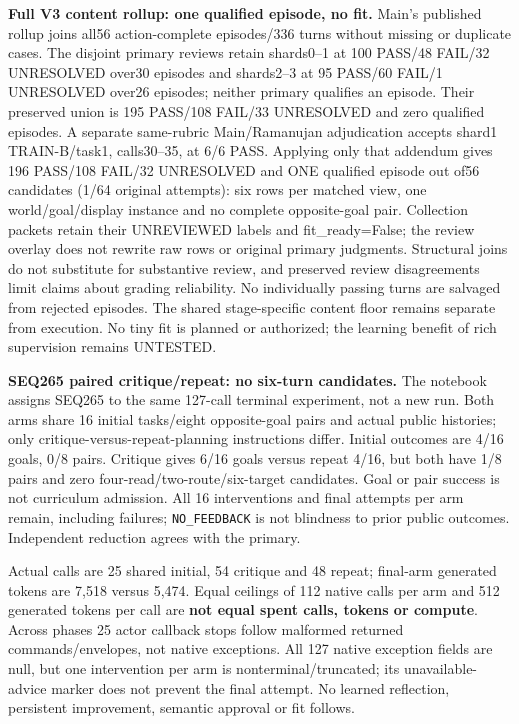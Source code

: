 \documentclass[11pt]{article}
\begin{document}
\textbf{Full V3 content rollup: one qualified episode, no fit.}
Main's published rollup joins all56 action-complete episodes/336 turns without
missing or duplicate cases. The disjoint primary reviews retain shards0--1 at
100 PASS/48 FAIL/32 UNRESOLVED over30 episodes and shards2--3 at
95 PASS/60 FAIL/1 UNRESOLVED over26 episodes; neither primary qualifies an
episode. Their preserved union is 195 PASS/108 FAIL/33 UNRESOLVED and
zero qualified episodes. A separate same-rubric Main/Ramanujan adjudication
accepts shard1 TRAIN-B/task1, calls30--35, at 6/6 PASS. Applying only that
addendum gives 196 PASS/108 FAIL/32 UNRESOLVED and ONE qualified episode
out of56 candidates (1/64 original attempts): six rows per matched view,
one world/goal/display instance and no complete opposite-goal pair.
Collection packets retain their UNREVIEWED labels and fit\_ready=False;
the review overlay does not rewrite raw rows or original primary judgments.
Structural joins do not substitute for substantive review, and preserved
review disagreements limit claims about grading reliability. No individually
passing turns are salvaged from rejected episodes. The shared stage-specific
content floor remains separate from execution. No tiny fit is planned or
authorized; the learning benefit of rich supervision remains UNTESTED.

\textbf{SEQ265 paired critique/repeat: no six-turn candidates.} The notebook assigns
SEQ265 to the same 127-call terminal experiment, not a new run.
Both arms share 16 initial tasks/eight opposite-goal pairs and actual public
histories; only critique-versus-repeat-planning instructions differ. Initial
outcomes are 4/16 goals, 0/8 pairs. Critique gives 6/16 goals versus repeat 4/16,
but both have 1/8 pairs and zero four-read/two-route/six-target candidates.
Goal or pair success is not curriculum admission. All 16 interventions and
final attempts per arm remain, including failures; \texttt{NO\_FEEDBACK} is not
blindness to prior public outcomes. Independent reduction agrees with the primary.

Actual calls are 25 shared initial, 54 critique and 48 repeat; final-arm
generated tokens are 7,518 versus 5,474. Equal ceilings of 112 native calls
per arm and 512 generated tokens per call are
\textbf{not equal spent calls, tokens or compute}. Across phases 25 actor callback
stops follow malformed returned commands/envelopes, not native exceptions.
All 127 native exception fields are null, but one intervention per arm is
nonterminal/truncated; its unavailable-advice marker does not prevent the
final attempt. No learned reflection, persistent improvement, semantic
approval or fit follows.
\end{document}
